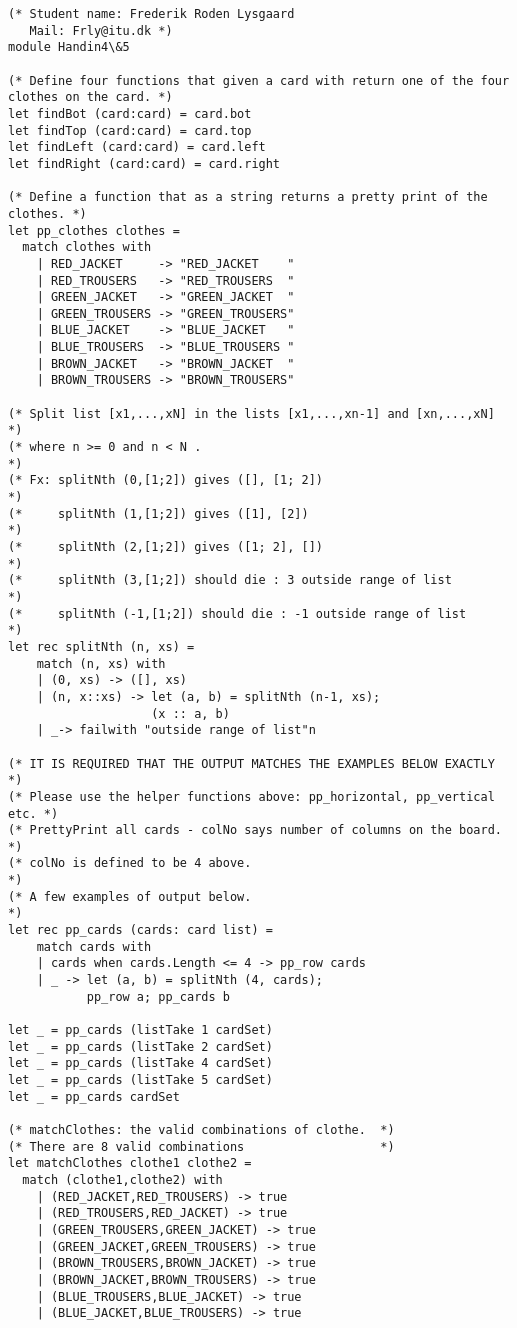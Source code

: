 \begin{lstlisting}
(* Student name: Frederik Roden Lysgaard
   Mail: Frly@itu.dk *)
module Handin4\&5

(* Define four functions that given a card with return one of the four clothes on the card. *)
let findBot (card:card) = card.bot
let findTop (card:card) = card.top
let findLeft (card:card) = card.left
let findRight (card:card) = card.right

(* Define a function that as a string returns a pretty print of the clothes. *)
let pp_clothes clothes =
  match clothes with
    | RED_JACKET     -> "RED_JACKET    "
    | RED_TROUSERS   -> "RED_TROUSERS  "
    | GREEN_JACKET   -> "GREEN_JACKET  "
    | GREEN_TROUSERS -> "GREEN_TROUSERS" 
    | BLUE_JACKET    -> "BLUE_JACKET   "
    | BLUE_TROUSERS  -> "BLUE_TROUSERS "
    | BROWN_JACKET   -> "BROWN_JACKET  "
    | BROWN_TROUSERS -> "BROWN_TROUSERS"
	
(* Split list [x1,...,xN] in the lists [x1,...,xn-1] and [xn,...,xN] *)
(* where n >= 0 and n < N .                                          *)
(* Fx: splitNth (0,[1;2]) gives ([], [1; 2])                         *)
(*     splitNth (1,[1;2]) gives ([1], [2])                           *)
(*     splitNth (2,[1;2]) gives ([1; 2], [])                         *)
(*     splitNth (3,[1;2]) should die : 3 outside range of list       *)
(*     splitNth (-1,[1;2]) should die : -1 outside range of list     *)
let rec splitNth (n, xs) = 
    match (n, xs) with
    | (0, xs) -> ([], xs)
    | (n, x::xs) -> let (a, b) = splitNth (n-1, xs);
                    (x :: a, b)
    | _-> failwith "outside range of list"n
	
(* IT IS REQUIRED THAT THE OUTPUT MATCHES THE EXAMPLES BELOW EXACTLY *)
(* Please use the helper functions above: pp_horizontal, pp_vertical etc. *)
(* PrettyPrint all cards - colNo says number of columns on the board.     *)
(* colNo is defined to be 4 above.                                        *)
(* A few examples of output below.                                        *)
let rec pp_cards (cards: card list) =
    match cards with
    | cards when cards.Length <= 4 -> pp_row cards
    | _ -> let (a, b) = splitNth (4, cards);
           pp_row a; pp_cards b
 
let _ = pp_cards (listTake 1 cardSet)
let _ = pp_cards (listTake 2 cardSet)
let _ = pp_cards (listTake 4 cardSet)
let _ = pp_cards (listTake 5 cardSet)
let _ = pp_cards cardSet

(* matchClothes: the valid combinations of clothe.  *)
(* There are 8 valid combinations                   *)
let matchClothes clothe1 clothe2 =
  match (clothe1,clothe2) with
    | (RED_JACKET,RED_TROUSERS) -> true
    | (RED_TROUSERS,RED_JACKET) -> true
    | (GREEN_TROUSERS,GREEN_JACKET) -> true
    | (GREEN_JACKET,GREEN_TROUSERS) -> true
    | (BROWN_TROUSERS,BROWN_JACKET) -> true
    | (BROWN_JACKET,BROWN_TROUSERS) -> true
    | (BLUE_TROUSERS,BLUE_JACKET) -> true
    | (BLUE_JACKET,BLUE_TROUSERS) -> true
	

\end{lstlisting}
